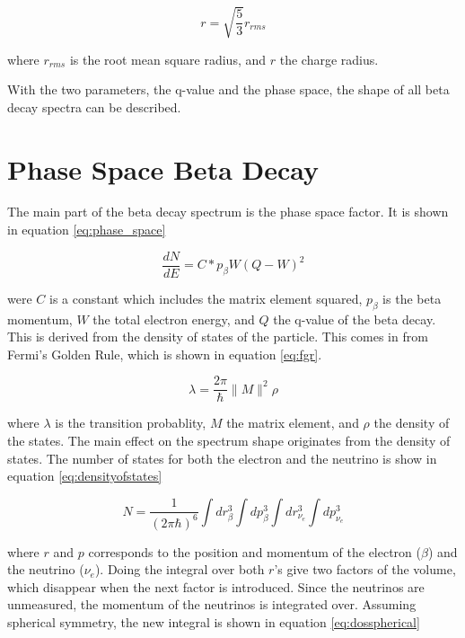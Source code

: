 \begin{equation}
	r = \sqrt{\frac{5}{3}}r_{rms}	
	\label{eq:sphereeq}
\end{equation}

where $r_{rms}$ is the root mean square radius, and $r$ the charge radius.

With the two parameters, the q-value and the phase space, the shape of all beta decay spectra can be described.

\section{Phase Space Beta Decay}
The main part of the beta decay spectrum is the phase space factor.
It is shown in equation \ref{eq:phase_space}

\begin{equation}
	\frac{dN}{dE} = C * p_{\beta}W(Q - W)^{2}
	\label{eq:phase_space}
\end{equation}

were $C$ is a constant which includes the matrix element squared, $p_{\beta}$ is the beta momentum, $W$ the total electron energy, and $Q$ the q-value of the beta decay.
This is derived from the density of states of the particle.
This comes in from Fermi's Golden Rule, which is shown in equation \ref{eq:fgr}.

\begin{equation}
	\lambda = \frac{2\pi}{\hbar}\|M\|^{2}\rho
	\label{eq:fgr}
\end{equation}

where $\lambda$ is the transition probablity, $M$ the matrix element, and $\rho$ the density of the states.
The main effect on the spectrum shape originates from the density of states.
The number of states for both the electron and the neutrino is show in equation \ref{eq:densityofstates}

\begin{equation}
	N = \frac{1}{(2\pi\hbar)^{6}}\int dr^{3}_{\beta} \int dp^{3}_{\beta}\int dr^{3}_{\nu_{e}} \int dp^{3}_{\nu_{e}} 
	\label{eq:densityofstates}
\end{equation}

where $r$ and $p$ corresponds to the position and momentum of the electron ($\beta$) and the neutrino ($\nu_{e}$).
Doing the integral over both $r$'s give two factors of the volume, which disappear when the next factor is introduced.
Since the neutrinos are unmeasured, the momentum of the neutrinos is integrated over. 
Assuming spherical symmetry, the new integral is shown in equation \ref{eq:dosspherical}

